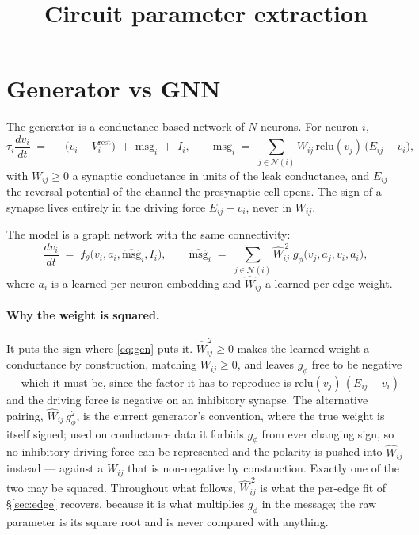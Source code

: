 \documentclass[11pt,a4paper]{article}
\title{Circuit parameter extraction}
\author{}
\date{}
\newcommand{\vj}{v_j}
\newcommand{\vi}{v_i}
\newcommand{\Wij}{W_{ij}}
\newcommand{\Eij}{E_{ij}}
\newcommand{\msg}{\mathrm{msg}}
\newcommand{\act}{\mathrm{relu}}
\begin{document}
\maketitle



\section{Generator vs GNN}

The generator is a conductance-based network of $N$ neurons. For neuron $i$,
%
\begin{equation}
\tau_i \frac{d\vi}{dt}
   \;=\; -\bigl(\vi - V^{\mathrm{rest}}_i\bigr) \;+\; \msg_i \;+\; I_i ,
\qquad
\msg_i \;=\; \sum_{j \in \mathcal{N}(i)} \Wij \,\act(\vj)\,\bigl(\Eij - \vi\bigr),
\label{eq:gen}
\end{equation}
%
with $\Wij \ge 0$ a synaptic conductance in
units of the leak conductance, and $\Eij$ the reversal potential of the channel
the presynaptic cell opens. The sign of a synapse lives entirely in the driving
force $\Eij - \vi$, never in $\Wij$.

The model is a graph network with the same connectivity:
%
\begin{equation}
\frac{d\vi}{dt} \;=\; f_\theta\!\bigl(\vi, a_i, \widehat{\msg}_i, I_i\bigr),
\qquad
\widehat{\msg}_i \;=\; \sum_{j \in \mathcal{N}(i)} \widehat{W}_{ij}^{\,2}\;
     g_\phi\!\bigl(\vj, a_j, \vi, a_i\bigr),
\label{eq:model}
\end{equation}
%
where $a_i$ is a learned per-neuron embedding and $\widehat{W}_{ij}$ a learned
per-edge weight.

\paragraph{Why the weight is squared.} It puts the sign where
\eqref{eq:gen} puts it. $\widehat{W}_{ij}^{\,2} \ge 0$ makes the learned weight a
conductance by construction, matching $\Wij \ge 0$, and leaves $g_\phi$ free to
be negative --- which it must be, since the factor it has to reproduce is
$\act(\vj)\,(\Eij - \vi)$ and the driving force is negative on an inhibitory
synapse. The alternative pairing, $\widehat{W}_{ij}\,g_\phi^2$, is the current
generator's convention, where the true weight is itself signed; used on
conductance data it forbids $g_\phi$ from ever changing sign, so no inhibitory
driving force can be represented and the polarity is pushed into
$\widehat{W}_{ij}$ instead --- against a $\Wij$ that is non-negative by
construction. Exactly one of the two may be squared. Throughout what follows,
$\widehat{W}_{ij}^{\,2}$ is what the per-edge fit of \S\ref{sec:edge} recovers,
because it is what multiplies $g_\phi$ in the message; the raw parameter is its
square root and is never compared with anything.
\end{document}
